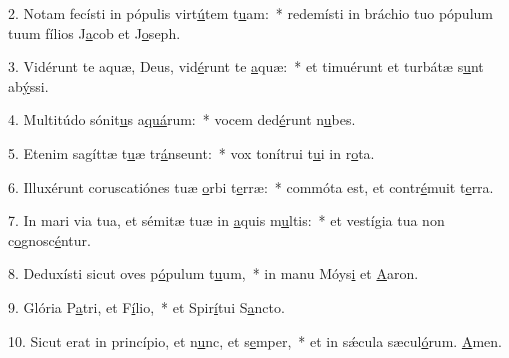 2. Notam fecísti in pópulis virt\uline{ú}tem t\uline{u}am:~* redemísti in bráchio tuo pópulum tuum fílios J\uline{a}cob et J\uline{o}seph.\par 
3. Vidérunt te aquæ, Deus, vid\uline{é}runt te \uline{a}quæ:~* et timuérunt et turbátæ s\uline{u}nt ab\uline{ý}ssi.\par 
4. Multitúdo sónit\uline{u}s a\uline{quá}rum:~* vocem ded\uline{é}runt n\uline{u}bes.\par 
5. Etenim sagíttæ t\uline{u}æ tr\uline{á}nseunt:~* vox tonítrui t\uline{u}i in r\uline{o}ta.\par 
6. Illuxérunt coruscatiónes tuæ \uline{o}rbi t\uline{e}rræ:~* commóta est, et contr\uline{é}muit t\uline{e}rra.\par 
7. In mari via tua, et sémitæ tuæ in \uline{a}quis m\uline{u}ltis:~* et vestígia tua non c\uline{o}gnosc\uline{é}ntur.\par 
8. Deduxísti sicut oves p\uline{ó}pulum t\uline{u}um,~* in manu Móys\uline{i} et \uline{A}aron.\par 
9. Glória P\uline{a}tri, et F\uline{í}lio,~* et Spir\uline{í}tui S\uline{a}ncto.\par 
10. Sicut erat in princípio, et n\uline{u}nc, et s\uline{e}mper,~* et in sǽcula sæcul\uline{ó}rum. \uline{A}men.\par 
